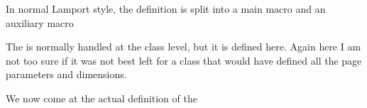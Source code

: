 In normal Lamport style, the definition is split into a main macro and an auxiliary
macro \CMDI{\textsuperscript}
%
%
The \CMDI{\footnotesep} is normally handled at the class level, but it is defined
here. Again here I am not too sure if it was not best left for a class that would have
defined all the page parameters and dimensions.

 \begin{macro}{\footnotesep}
    \begin{teX}
\newdimen\footnotesep
    \end{teX}
 \end{macro}
%
We now come at the actual definition of the 
 \begin{macro}{\footnote}
%
    \begin{teX}
\def\footnote{\@ifnextchar[\@xfootnote{\stepcounter\@mpfn
     \protected@xdef\@thefnmark{\thempfn}%
     \@footnotemark\@footnotetext}}
    \end{teX}
 \end{macro}
%
 \begin{macro}{\@xfootnote}
    \begin{teX}
\def\@xfootnote[#1]{%
   \begingroup 
     \csname c@\@mpfn\endcsname #1\relax
     \unrestored@protected@xdef\@thefnmark{\thempfn}%
   \endgroup
   \@footnotemark\@footnotetext}
    \end{teX}
 \end{macro}

